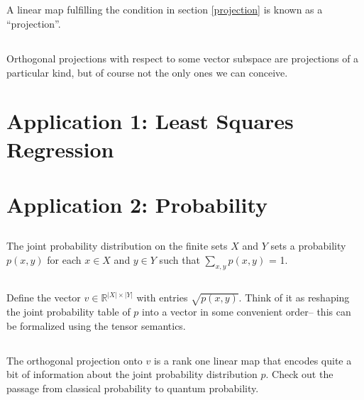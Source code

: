 \documentclass{proc-l}
\theoremstyle{definition}
\theoremstyle{remark}
\numberwithin{equation}{section}
\newcommand{\R}{\mathbb{R}}
\begin{document}
\subsection{}
A linear map fulfilling the condition in section \ref{projection} is known as a ``projection''.

\subsection{}
Orthogonal projections with respect to some vector subspace are projections of a particular kind, but of course not the only ones we can conceive.

\section{Application 1: Least Squares Regression}


\section{Application 2: Probability}

\subsection{}
The joint probability distribution on the finite sets $X$ and $Y$ sets a probability $p(x,y)$ for each $x\in X$ and $y\in Y$ such that $\sum_{x,y} p(x,y)$ = 1. 

\subsection{}
Define the vector $v\in\R^{|X|\times|Y|}$ with entries $\sqrt{p(x,y)}$. Think of it as reshaping the joint probability table of $p$ into a vector in some convenient order-- this can be formalized using the tensor semantics.

\subsection{}
The orthogonal projection onto $v$ is a rank one linear map that encodes quite a bit of information about the joint probability distribution $p$. Check out the passage from classical probability to quantum probability.




\end{document}
